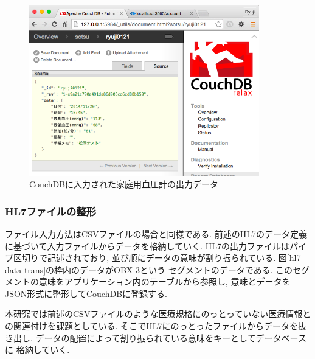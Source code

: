			\begin{figure}[htbp]
				\begin{center}
					\includegraphics[width=10cm, bb=0 0 640 475]{./gazou/blood-data-couch.png}
				\end{center}
				\caption{CouchDBに入力された家庭用血圧計の出力データ}
				\label{blood-data-couch}
			\end{figure}

		\subsubsection{HL7ファイルの整形}
			ファイル入力方法はCSVファイルの場合と同様である.
			前述のHL7のデータ定義に基づいて入力ファイルからデータを格納していく.
			HL7の出力ファイルはパイプ区切りで記述されており,
			並び順にデータの意味が割り振られている.
			図\ref{hl7-data-trans}の枠内のデータがOBX-3という
			セグメントのデータである.
			このセグメントの意味をアプリケーション内のテーブルから参照し,
			意味とデータをJSON形式に整形してCouchDBに登録する.


			本研究では前述のCSVファイルのような医療規格にのっとっていない医療情報との関連付けを課題としている.
			そこでHL7にのっとったファイルからデータを抜き出し,
			データの配置によって割り振られている意味をキーとしてデータベースに
			格納していく.

